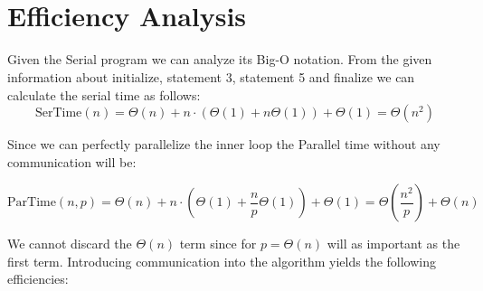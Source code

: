\documentclass[a4paper]{article}
\title{\HWTitle \\ \vspace{.25cm} \large\HWSubtitle}
\author{\HWAuthorName}
\date{\HWDueDate}
\begin{document}
\maketitle
\thispagestyle{fancy}

\section{Efficiency Analysis}

    Given the Serial program we can analyze its Big-O notation. From the given information about initialize, statement 3, statement 5 and finalize we can calculate the serial time as follows:
    \begin{equation}
        \text{SerTime}(n) = \Theta(n) + n\cdot(\Theta(1) + n\Theta(1)) + \Theta(1) = \Theta(n^2)
    \end{equation}

    Since we can perfectly parallelize the inner loop the Parallel time without any communication will be:

    \begin{equation}
        \text{ParTime}(n,p) = \Theta(n) + n\cdot \left(\Theta(1) + \frac{n}{p}\Theta(1) \right) + \Theta(1) = \Theta \left(\frac{n^2}{p}\right) + \Theta(n)
    \end{equation}

    We cannot discard the $\Theta(n)$ term since for $p = \Theta(n)$ will as important as the first term. Introducing communication into the algorithm yields the following efficiencies:
\end{document}
